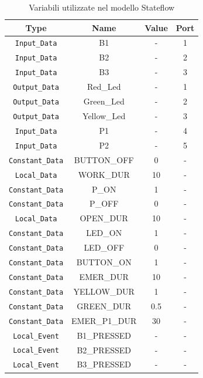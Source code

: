 \documentclass[12pt]{article}
\begin{document}
\begin{table}[H]
\centering
\begin{tabular}{|c|c|c|c|}
\hline
\textbf{Type} & \textbf{Name} & \textbf{Value} & \textbf{Port} \\ \hline
\texttt{Input\_Data} & B1 & - & 1 \\ \hline
\texttt{Input\_Data} & B2 & - & 2 \\ \hline
\texttt{Input\_Data} & B3 & - & 3 \\ \hline
\texttt{Output\_Data} & Red\_Led & - & 1 \\ \hline
\texttt{Output\_Data} & Green\_Led & - & 2 \\ \hline
\texttt{Output\_Data} & Yellow\_Led & - & 3 \\ \hline
\texttt{Input\_Data} & P1 & - & 4 \\ \hline
\texttt{Input\_Data} & P2 & - & 5 \\ \hline
\texttt{Constant\_Data} & BUTTON\_OFF & 0 & - \\ \hline
\texttt{Local\_Data} & WORK\_DUR & 10 & - \\ \hline
\texttt{Constant\_Data} & P\_ON & 1 & - \\ \hline
\texttt{Constant\_Data} & P\_OFF & 0 & - \\ \hline
\texttt{Local\_Data} & OPEN\_DUR & 10 & - \\ \hline
\texttt{Constant\_Data} & LED\_ON & 1 & - \\ \hline
\texttt{Constant\_Data} & LED\_OFF & 0 & - \\ \hline
\texttt{Constant\_Data} & BUTTON\_ON & 1 & - \\ \hline
\texttt{Constant\_Data} & EMER\_DUR & 10 & - \\ \hline
\texttt{Constant\_Data} & YELLOW\_DUR & 1 & - \\ \hline
\texttt{Constant\_Data} & GREEN\_DUR & 0.5 & - \\ \hline
\texttt{Constant\_Data} & EMER\_P1\_DUR & 30 & - \\ \hline
\texttt{Local\_Event} & B1\_PRESSED & - & - \\ \hline
\texttt{Local\_Event} & B2\_PRESSED & - & - \\ \hline
\texttt{Local\_Event} & B3\_PRESSED & - & - \\ \hline

\end{tabular}
\caption{Variabili utilizzate nel modello Stateflow}
\label{tab:variables}
\end{table}
\end{document}
